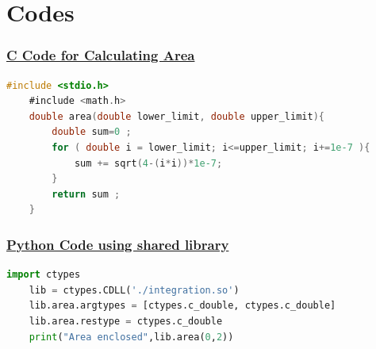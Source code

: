 \documentclass{beamer}
\theoremstyle{remark}
\numberwithin{equation}{section}
\begin{document}
\section{Codes}
\begin{frame}[fragile]
	\frametitle{\underline{C Code for Calculating Area}}
	\begin{lstlisting}[language=C]
	#include <stdio.h>
	#include <math.h>
	double area(double lower_limit, double upper_limit){
		double sum=0 ;
		for ( double i = lower_limit; i<=upper_limit; i+=1e-7 ){
			sum += sqrt(4-(i*i))*1e-7;
		}
		return sum ;
	}
	\end{lstlisting}
\end{frame}

\begin{frame}[fragile]
	\frametitle{\underline{Python Code using shared library}}
	\begin{lstlisting}[language=Python]
	import ctypes
	lib = ctypes.CDLL('./integration.so')
	lib.area.argtypes = [ctypes.c_double, ctypes.c_double]
	lib.area.restype = ctypes.c_double
	print("Area enclosed",lib.area(0,2))
	\end{lstlisting}
\end{frame}
\end{document}
